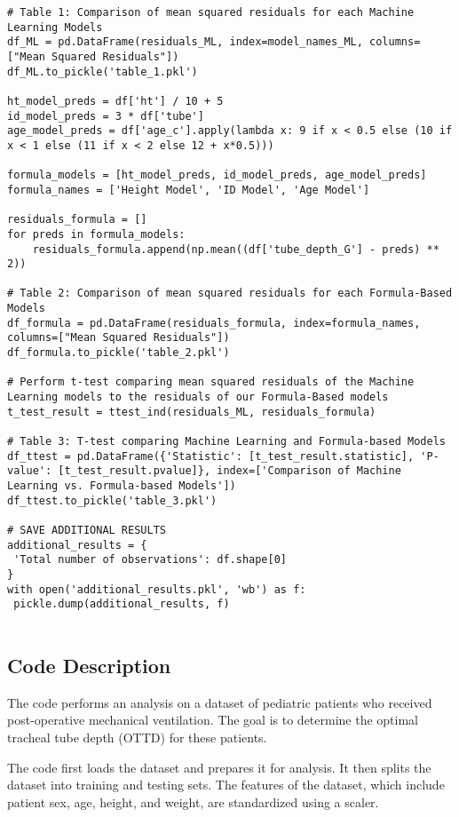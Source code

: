 \documentclass[11pt]{article}
\begin{document}
\begin{verbatim}
# Table 1: Comparison of mean squared residuals for each Machine Learning Models
df_ML = pd.DataFrame(residuals_ML, index=model_names_ML, columns=["Mean Squared Residuals"])
df_ML.to_pickle('table_1.pkl')

ht_model_preds = df['ht'] / 10 + 5
id_model_preds = 3 * df['tube']
age_model_preds = df['age_c'].apply(lambda x: 9 if x < 0.5 else (10 if x < 1 else (11 if x < 2 else 12 + x*0.5)))

formula_models = [ht_model_preds, id_model_preds, age_model_preds]
formula_names = ['Height Model', 'ID Model', 'Age Model']

residuals_formula = []
for preds in formula_models:
    residuals_formula.append(np.mean((df['tube_depth_G'] - preds) ** 2))

# Table 2: Comparison of mean squared residuals for each Formula-Based Models
df_formula = pd.DataFrame(residuals_formula, index=formula_names, columns=["Mean Squared Residuals"])
df_formula.to_pickle('table_2.pkl')

# Perform t-test comparing mean squared residuals of the Machine Learning models to the residuals of our Formula-Based models
t_test_result = ttest_ind(residuals_ML, residuals_formula)

# Table 3: T-test comparing Machine Learning and Formula-based Models
df_ttest = pd.DataFrame({'Statistic': [t_test_result.statistic], 'P-value': [t_test_result.pvalue]}, index=['Comparison of Machine Learning vs. Formula-based Models'])
df_ttest.to_pickle('table_3.pkl')

# SAVE ADDITIONAL RESULTS
additional_results = {
 'Total number of observations': df.shape[0]
}
with open('additional_results.pkl', 'wb') as f:
 pickle.dump(additional_results, f)


\end{verbatim}

\subsection{Code Description}

The code performs an analysis on a dataset of pediatric patients who received post-operative mechanical ventilation. The goal is to determine the optimal tracheal tube depth (OTTD) for these patients. 

The code first loads the dataset and prepares it for analysis. It then splits the dataset into training and testing sets. The features of the dataset, which include patient sex, age, height, and weight, are standardized using a scaler. 
\end{document}
